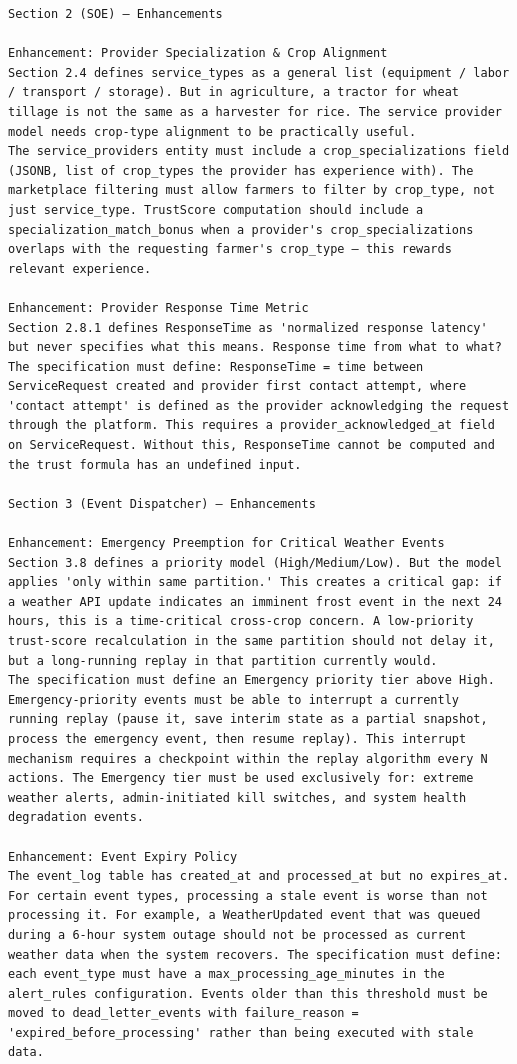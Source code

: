 \documentclass{article}
\begin{document}
\begin{verbatim}
Section 2 (SOE) — Enhancements

Enhancement: Provider Specialization & Crop Alignment
Section 2.4 defines service_types as a general list (equipment / labor / transport / storage). But in agriculture, a tractor for wheat tillage is not the same as a harvester for rice. The service provider model needs crop-type alignment to be practically useful.
The service_providers entity must include a crop_specializations field (JSONB, list of crop_types the provider has experience with). The marketplace filtering must allow farmers to filter by crop_type, not just service_type. TrustScore computation should include a specialization_match_bonus when a provider's crop_specializations overlaps with the requesting farmer's crop_type — this rewards relevant experience.

Enhancement: Provider Response Time Metric
Section 2.8.1 defines ResponseTime as 'normalized response latency' but never specifies what this means. Response time from what to what? The specification must define: ResponseTime = time between ServiceRequest created and provider first contact attempt, where 'contact attempt' is defined as the provider acknowledging the request through the platform. This requires a provider_acknowledged_at field on ServiceRequest. Without this, ResponseTime cannot be computed and the trust formula has an undefined input.

Section 3 (Event Dispatcher) — Enhancements

Enhancement: Emergency Preemption for Critical Weather Events
Section 3.8 defines a priority model (High/Medium/Low). But the model applies 'only within same partition.' This creates a critical gap: if a weather API update indicates an imminent frost event in the next 24 hours, this is a time-critical cross-crop concern. A low-priority trust-score recalculation in the same partition should not delay it, but a long-running replay in that partition currently would.
The specification must define an Emergency priority tier above High. Emergency-priority events must be able to interrupt a currently running replay (pause it, save interim state as a partial snapshot, process the emergency event, then resume replay). This interrupt mechanism requires a checkpoint within the replay algorithm every N actions. The Emergency tier must be used exclusively for: extreme weather alerts, admin-initiated kill switches, and system health degradation events.

Enhancement: Event Expiry Policy
The event_log table has created_at and processed_at but no expires_at. For certain event types, processing a stale event is worse than not processing it. For example, a WeatherUpdated event that was queued during a 6-hour system outage should not be processed as current weather data when the system recovers. The specification must define: each event_type must have a max_processing_age_minutes in the alert_rules configuration. Events older than this threshold must be moved to dead_letter_events with failure_reason = 'expired_before_processing' rather than being executed with stale data.


\end{verbatim}
\end{document}
